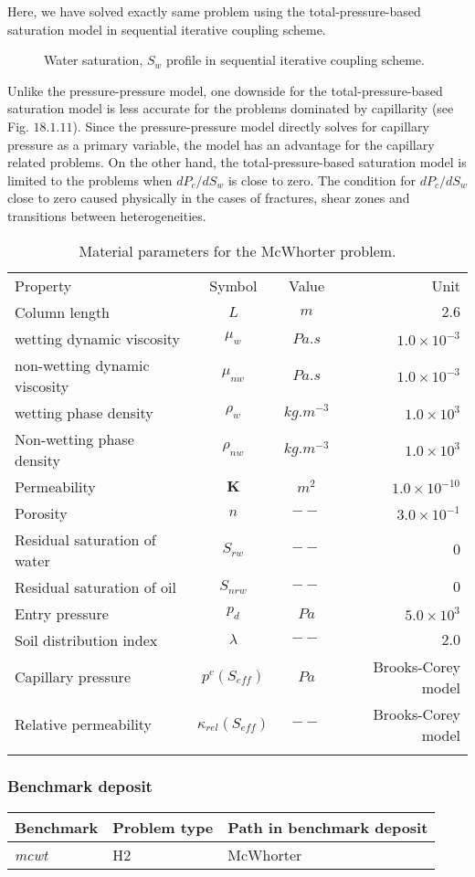 Here, we have solved exactly same problem using the total-pressure-based saturation model in sequential iterative coupling scheme.
\begin{figure}[H]
\begin{center}
\end{center}
\caption{Water saturation, $S_w$ profile in sequential iterative coupling scheme.}
\label{mcwt:psModel}
\end{figure}
Unlike the pressure-pressure model, one downside for the total-pressure-based saturation model is less accurate for the problems dominated by capillarity (see Fig. $18.1.11$). Since the pressure-pressure model directly solves for capillary pressure as a primary variable, the model has an advantage for the capillary related problems. On the other hand, the total-pressure-based saturation model is limited to the problems when $d P_c/d S_w$ is close to zero. The condition for $d P_c/d S_w$ close to zero caused physically in the cases of fractures, shear zones and transitions between heterogeneities.
\begin{table}[!htb]
\begin{tabular}{lccr}
\hline\hline\noalign{\smallskip}
Property & Symbol & Value & Unit \\
\noalign{\smallskip}\hline\noalign{\smallskip}
Column length & $L$ & $m$ & $2.6$  \\
wetting dynamic viscosity &  $\mu_w$ & $Pa.s$ & $1.0\times10^{-3}$ \\
non-wetting dynamic viscosity & $\mu_{nw}$ & $Pa.s$ & $1.0\times10^{-3}$ \\
wetting phase density &  $\rho_w$ &$kg.m^{-3}$ & $1.0\times10^{3}$ \\
Non-wetting phase density &  $\rho_{nw}$ & $kg.m^{-3}$ & $1.0\times10^{3}$ \\
Permeability & $\mathbf K$ & $ m^2$ & $1.0\times 10^{-10}$ \\
Porosity & $n$ & $--$ & $3.0\times10^{-1}$ \\
Residual saturation of water &  $S_{rw}$ & $--$ & $0$ \\
Residual saturation of oil &  $S_{nrw}$ & $--$ & $0$ \\
Entry pressure &  $p_d$ & $Pa$ & $5.0\times10^{3}$ \\
Soil distribution index &  $\lambda$ & $--$ & $2.0$ \\
Capillary pressure & $p^c(S_{eff})$ & $Pa$ & Brooks-Corey model\\
Relative permeability & $\kappa_{rel}(S_{eff})$ & $--$ & Brooks-Corey model \\
\noalign{\smallskip}\hline\hline
\end{tabular}
\caption{Material parameters for the McWhorter problem.}
\end{table}
\clearpage
\subsubsection*{\upshape\textbf{Benchmark deposit}}
\begin{tabular}{|l|l|l|}
\hline
Benchmark & Problem type & Path in benchmark deposit \\
\hline
\emph{mcwt}& H2 & McWhorter \\
\hline
\end{tabular}
\clearpage
